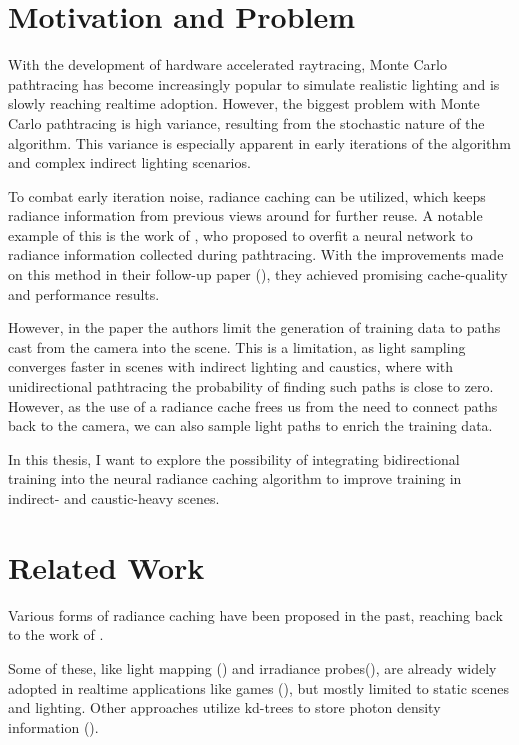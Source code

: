 \section{Motivation and Problem}

With the development of hardware accelerated raytracing, Monte Carlo pathtracing has become increasingly popular to simulate realistic lighting and is slowly reaching realtime adoption.
However, the biggest problem with Monte Carlo pathtracing is high variance, resulting from the stochastic nature of the algorithm.
This variance is especially apparent in early iterations of the algorithm and complex indirect lighting scenarios.


To combat early iteration noise, radiance caching can be utilized, which keeps radiance information from previous views around for further reuse.
A notable example of this is the work of \textcite{muller2021}, who proposed to overfit a neural network to radiance information collected during pathtracing.
With the improvements made on this method in their follow-up paper (\cite{muller2022}), they achieved promising cache-quality and performance results.

However, in the paper the authors limit the generation of training data to paths cast from the camera into the scene.
This is a limitation, as light sampling converges faster in scenes with indirect lighting and caustics, where with unidirectional pathtracing the probability of finding such paths is close to zero.
However, as the use of a radiance cache frees us from the need to connect paths back to the camera, we can also sample light paths to enrich the training data. %


In this thesis, I want to explore the possibility of integrating bidirectional training into the neural radiance caching algorithm to improve training in indirect- and caustic-heavy scenes.

\section{Related Work}

Various forms of radiance caching have been proposed in the past, reaching back to the work of \textcite{ward1988}.


Some of these, like light mapping (\cite{arvo1986}) and irradiance probes(\cite{greger1998}), are already widely adopted in realtime applications like games (\cite{oat2005, abrash1996}), but mostly limited to static scenes and lighting.
Other approaches utilize kd-trees to store photon density information (\cite{jensen1996}).


